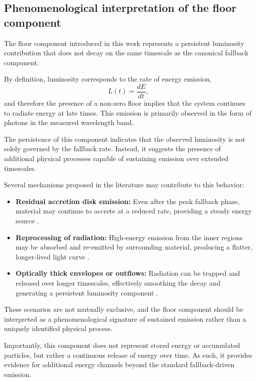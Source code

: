 \documentclass[11pt]{article}
\begin{document}
\subsection{Phenomenological interpretation of the floor component}
The floor component introduced in this work represents a persistent luminosity contribution that does not decay on the same timescale as the canonical fallback component.

By definition, luminosity corresponds to the rate of energy emission,
\begin{equation}
L(t) = \frac{dE}{dt},
\end{equation}
and therefore the presence of a non-zero floor implies that the system continues to radiate energy at late times. This emission is primarily observed in the form of photons in the measured wavelength band.

The persistence of this component indicates that the observed luminosity is not solely governed by the fallback rate. Instead, it suggests the presence of additional physical processes capable of sustaining emission over extended timescales.

Several mechanisms proposed in the literature may contribute to this behavior:
\begin{itemize}
    \item \textbf{Residual accretion disk emission:} Even after the peak fallback phase, material may continue to accrete at a reduced rate, providing a steady energy source \citep{metzger2016,auchettl2017}.

    \item \textbf{Reprocessing of radiation:} High-energy emission from the inner regions may be absorbed and re-emitted by surrounding material, producing a flatter, longer-lived light curve \citep{guillochon2014,roth2016}.

    \item \textbf{Optically thick envelopes or outflows:} Radiation can be trapped and released over longer timescales, effectively smoothing the decay and generating a persistent luminosity component \citep{metzger2016}.
\end{itemize}
These scenarios are not mutually exclusive, and the floor component should be interpreted as a phenomenological signature of sustained emission rather than a uniquely identified physical process.

Importantly, this component does not represent stored energy or accumulated particles, but rather a continuous release of energy over time. As such, it provides evidence for additional energy channels beyond the standard fallback-driven emission.
\end{document}
